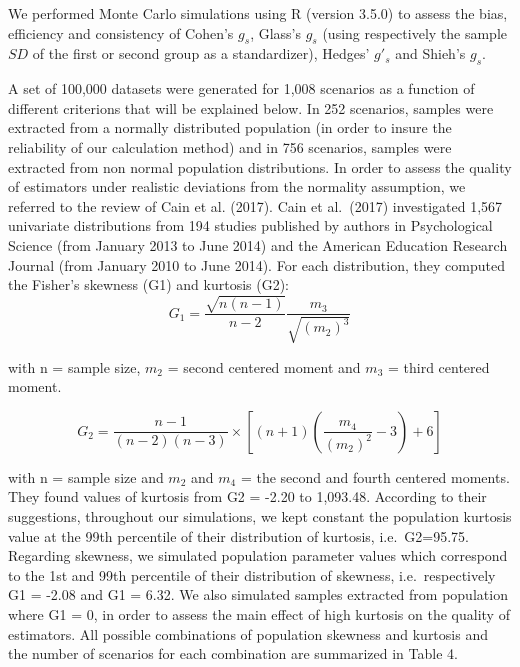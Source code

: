 \documentclass[
  man,floatsintext]{apa6}
\begin{document}
We performed Monte Carlo simulations using R (version 3.5.0) to assess the bias, efficiency and consistency of Cohen's \(g_s\), Glass's \(g_s\) (using respectively the sample \(SD\) of the first or second group as a standardizer), Hedges' \(g'_s\) and Shieh's \(g_s\).

A set of 100,000 datasets were generated for 1,008 scenarios as a function of different criterions that will be explained below. In 252 scenarios, samples were extracted from a normally distributed population (in order to insure the reliability of our calculation method) and in 756 scenarios, samples were extracted from non normal population distributions. In order to assess the quality of estimators under realistic deviations from the normality assumption, we referred to the review of Cain et al. (2017). Cain et al.~(2017) investigated 1,567 univariate distributions from 194 studies published by authors in Psychological Science (from January 2013 to June 2014) and the American Education Research Journal (from January 2010 to June 2014). For each distribution, they computed the Fisher's skewness (G1) and kurtosis (G2):
\begin{equation} 
G_{1}=\frac{\sqrt{n(n-1)}}{n-2} \frac{m_{3}}{\sqrt{(m_{2})^3}}
\label{eq:skew}
\end{equation}

with n = sample size, \(m_{2}\) = second centered moment and \(m_{3}\) = third centered moment.

\begin{equation} 
G_{2}=\frac{n-1}{(n-2)(n-3)}\times [(n+1)(\frac{m_{4}}{(m_{2})^2}-3)+6]
\label{eq:kurt}
\end{equation}

with n = sample size and \(m_{2}\) and \(m_{4}\) = the second and fourth centered moments. They found values of kurtosis from G2 = -2.20 to 1,093.48. According to their suggestions, throughout our simulations, we kept constant the population kurtosis value at the 99th percentile of their distribution of kurtosis, i.e.~G2=95.75. Regarding skewness, we simulated population parameter values which correspond to the 1st and 99th percentile of their distribution of skewness, i.e.~respectively G1 = -2.08 and G1 = 6.32. We also simulated samples extracted from population where G1 = 0, in order to assess the main effect of high kurtosis on the quality of estimators. All possible combinations of population skewness and kurtosis and the number of scenarios for each combination are summarized in Table 4.

\newpage
\end{document}
